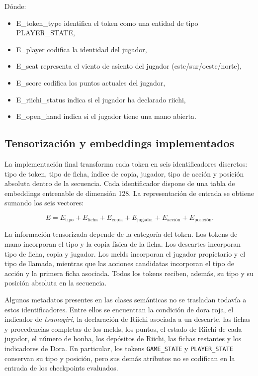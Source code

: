 Dónde:

\begin{itemize}
  \item E\_token\_type identifica el token como una entidad de tipo PLAYER\_STATE,
  \item E\_player codifica la identidad del jugador,
  \item E\_seat representa el viento de asiento del jugador (este/sur/oeste/norte),
  \item E\_score codifica los puntos actuales del jugador,
  \item E\_riichi\_status indica si el jugador ha declarado riichi,
  \item E\_open\_hand indica si el jugador tiene una mano abierta.
\end{itemize}

\subsection{Tensorización y embeddings implementados}

La implementación final transforma cada token en seis identificadores discretos: tipo de token, tipo de ficha, índice de copia, jugador, tipo de acción y posición absoluta dentro de la secuencia. Cada identificador dispone de una tabla de embeddings entrenable de dimensión 128. La representación de entrada se obtiene sumando los seis vectores:

\begin{equation}
E = E_{\text{tipo}} + E_{\text{ficha}} + E_{\text{copia}} + E_{\text{jugador}} + E_{\text{acción}} + E_{\text{posición}}.
\end{equation}

La información tensorizada depende de la categoría del token. Los tokens de mano incorporan el tipo y la copia física de la ficha. Los descartes incorporan tipo de ficha, copia y jugador. Los melds incorporan el jugador propietario y el tipo de llamada, mientras que las acciones candidatas incorporan el tipo de acción y la primera ficha asociada. Todos los tokens reciben, además, su tipo y su posición absoluta en la secuencia.

Algunos metadatos presentes en las clases semánticas no se trasladan todavía a estos identificadores. Entre ellos se encuentran la condición de dora roja, el indicador de \textit{tsumogiri}, la declaración de Riichi asociada a un descarte, las fichas y procedencias completas de los melds, los puntos, el estado de Riichi de cada jugador, el número de honba, los depósitos de Riichi, las fichas restantes y los indicadores de Dora. En particular, los tokens \texttt{GAME\_STATE} y \texttt{PLAYER\_STATE} conservan su tipo y posición, pero sus demás atributos no se codifican en la entrada de los checkpoints evaluados.

